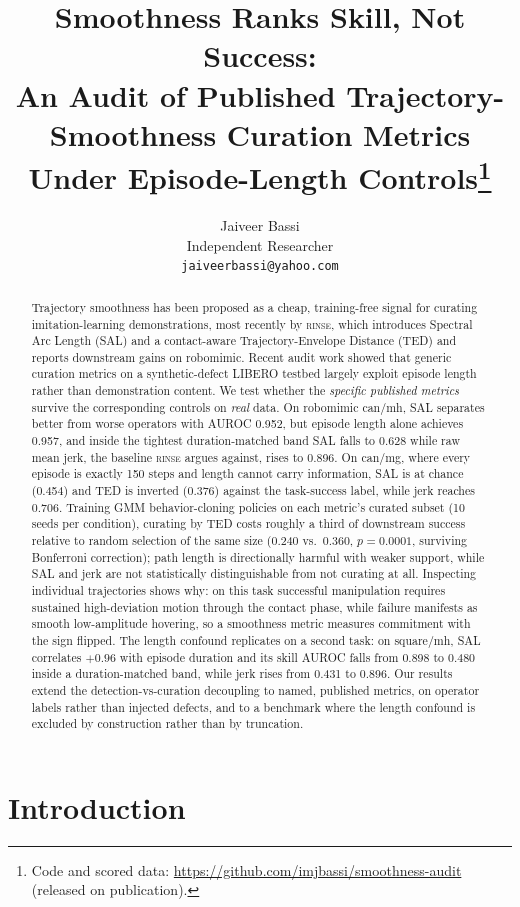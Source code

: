 \documentclass[10pt]{article}
\title{Smoothness Ranks Skill, Not Success:\\
An Audit of Published Trajectory-Smoothness Curation Metrics\\
Under Episode-Length Controls\thanks{Code and scored data:
\url{https://github.com/imjbassi/smoothness-audit} (released on publication).}}
\author{Jaiveer Bassi \\ Independent Researcher \\ \texttt{jaiveerbassi@yahoo.com}}
\date{}
\newcommand{\rinse}{\textsc{rinse}}
\begin{document}
\maketitle

\begin{abstract}
Trajectory smoothness has been proposed as a cheap, training-free signal for
curating imitation-learning demonstrations, most recently by \rinse{}, which
introduces Spectral Arc Length (SAL) and a contact-aware Trajectory-Envelope
Distance (TED) and reports downstream gains on robomimic. Recent audit work
showed that generic curation metrics on a synthetic-defect LIBERO testbed
largely exploit episode length rather than demonstration content. We test
whether the \emph{specific published metrics} survive the corresponding
controls on \emph{real} data. On robomimic can/mh, SAL separates
better from worse operators with AUROC 0.952, but episode length alone
achieves 0.957, and inside the tightest duration-matched band SAL falls to
0.628 while raw mean jerk, the baseline \rinse{} argues
against, rises to 0.896. On can/mg, where every episode is exactly 150
steps and length cannot carry information, SAL is at chance (0.454) and TED
is inverted (0.376) against the task-success label, while jerk reaches
0.706. Training GMM behavior-cloning policies on each metric's curated
subset (10 seeds per condition), curating by TED costs roughly a third of
downstream success relative to random selection of the same size (0.240
vs.\ 0.360, $p{=}0.0001$, surviving Bonferroni correction); path length is
directionally harmful with weaker support, while SAL and jerk are not
statistically distinguishable from not curating at all.
Inspecting individual trajectories shows why: on this task successful
manipulation requires sustained high-deviation motion through the contact
phase, while failure manifests as smooth low-amplitude hovering, so a
smoothness metric measures commitment with the sign flipped. The length
confound replicates on a second task: on square/mh, SAL correlates $+0.96$
with episode duration and its skill AUROC falls from 0.898 to 0.480 inside a
duration-matched band, while jerk rises from 0.431 to 0.896. Our results
extend the detection-vs-curation decoupling to named, published metrics, on
operator labels rather than injected defects, and to a benchmark where the
length confound is excluded by construction rather than by truncation.
\end{abstract}

\section{Introduction}
\end{document}
